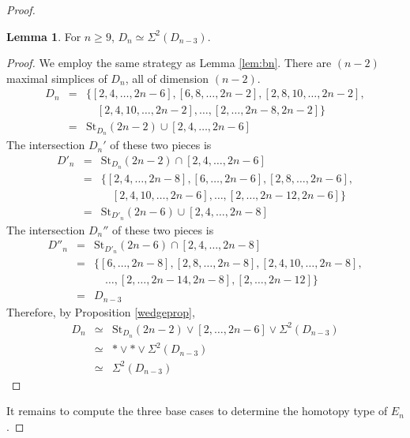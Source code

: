 \documentclass{amsart}
\theoremstyle{definition}
\newtheorem{lemma}[theorem]{Lemma}
\begin{document}
\begin{proof}
\begin{lemma}\label{lem:dn}
    For $n\geq 9$, $D_n\simeq\Sigma^2(D_{n-3})$.
\end{lemma}

\begin{proof}
We employ the same strategy as Lemma \ref{lem:bn}. There are $(n-2)$ maximal simplices of $D_n$, all of dimension $(n-2)$.
    \begin{eqnarray*}
        D_n & = & \{[2,4,\dots,2n-6],[6,8,\dots,2n-2],[2,8,10,\dots,2n-2], \\
        & & \quad [2,4,10,\dots,2n-2],\dots,[2,\dots,2n-8,2n-2]\}\\
        &= &\text{St}_{D_n}(2n-2)\cup[2,4,\dots,2n-6]
    \end{eqnarray*}
The intersection $D_n'$ of these two pieces is
    \begin{eqnarray*}
        D'_n & = &\text{St}_{D_n}(2n-2)\cap[2,4,\dots,2n-6]\\
        & = &\{[2,4,\dots,2n-8],[6,\dots,2n-6],[2,8,\dots,2n-6],\\
        & & \quad[2,4,10,\dots,2n-6],\dots,[2,\dots,2n-12,2n-6]\}\\
        &= &\text{St}_{D'_n}(2n-6)\cup[2,4,\dots,2n-8]
    \end{eqnarray*}
The intersection $D_n''$ of these two pieces is
    \begin{eqnarray*}
        D''_n &= &\text{St}_{D'_n}(2n-6)\cap[2,4,\dots,2n-8] \\
        & =& \{[6,\dots,2n-8],[2,8,\dots,2n-8],[2,4,10,\dots,2n-8],\\
        & & \quad \dots,[2,\dots,2n-14,2n-8],[2,\dots,2n-12]\}\\
        &= &D_{n-3}
    \end{eqnarray*}
Therefore, by Proposition \ref{wedgeprop},
    \begin{eqnarray*}
    D_n&\simeq &\text{St}_{D_n}(2n-2)\vee[2,\dots,2n-6]\vee\Sigma^2(D_{n-3})\\
    &\simeq & \ast\vee\ast\vee\Sigma^2(D_{n-3})\\
    &\simeq & \Sigma^2(D_{n-3})
    \end{eqnarray*}
\end{proof}

\noindent It remains to compute the three base cases to determine the homotopy type of $E_n$.


\end{proof}
\end{document}
